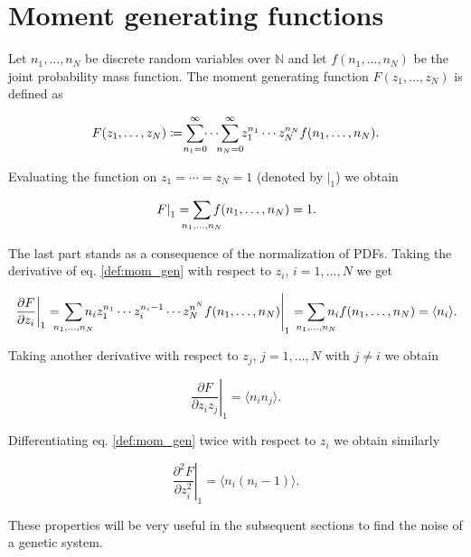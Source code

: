 \section{Moment generating functions}

Let $n_1,\dotsc,n_N$ be discrete random variables over $\mathbb{N}$ and let $f(n_1,\dotsc,n_N)$ be the joint probability mass function. The moment generating function $F(z_1,\dotsc,z_N)$ is defined as

\begin{equation}
\label{def:mom_gen}
F(z_1,\dotsc,z_N) \coloneqq \sum_{\mathclap{n_1=0}}^{\infty} \dotsi \sum_{\mathclap{n_N=0}}^{\infty} z_1^{n_1} \dotsm z_N^{n_N} f(n_1,\dotsc,n_N).
\end{equation}

Evaluating the function on $z_1 = \dotsb = z_N = 1$ (denoted by $\left. \right|_1$) we obtain

\begin{equation}
\left.F\right|_1 = \sum_{\mathclap{n_1,\dotsc,n_N}}f(n_1,\dotsc,n_N) = 1.
\end{equation}

The last part stands as a consequence of the normalization of PDFs. Taking the derivative of eq. \ref{def:mom_gen} with respect to $z_i$, $i = 1,\dotsc,N$ we get

\begin{equation}
\left.\frac{\partial F}{\partial z_i}\right|_1 = \left.\sum_{\mathclap{n_1,\dotsc,n_N}}n_i z_1^{n_1}\dotsm z_i^{n_i-1}\dotsm z_N^{n^N}f(n_1,\dotsc,n_N)\right|_1 = \sum_{\mathclap{n_1,\dotsc,n_N}} n_i f(n_1,\dotsc,n_N) = \langle n_i \rangle.
\end{equation}

Taking another derivative with respect to $z_j$, $j=1,\dotsc,N$ with $j\neq i$ we obtain

\begin{equation}
\left. \frac{\partial F}{\partial z_i z_j} \right|_1 = \langle n_i n_j \rangle.
\end{equation}

Differentiating eq. \ref{def:mom_gen} twice with respect to $z_i$ we obtain similarly

\begin{equation}
\left. \frac{\partial^2F}{\partial z_i^2}\right|_1 = \langle n_i(n_i-1) \rangle.
\end{equation}

These properties will be very useful in the subsequent sections to find the noise of a genetic system.

